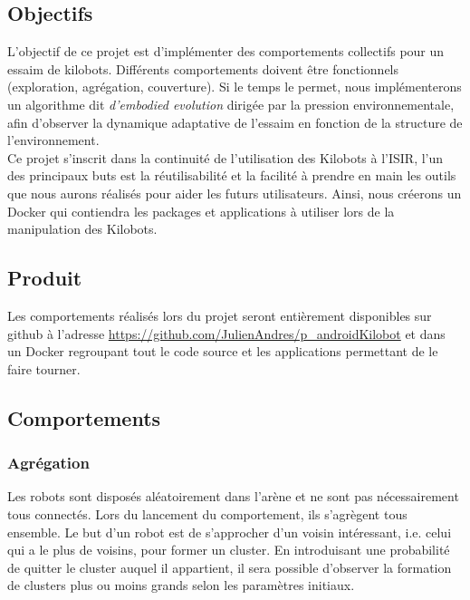 \documentclass[a4paper]{article}
\begin{document}
\subsection{Objectifs}

L'objectif de ce projet est d'implémenter des comportements collectifs pour un essaim de kilobots. Différents comportements doivent être fonctionnels (exploration, agrégation, couverture). Si le temps le permet, nous implémenterons un algorithme dit \textit{d'embodied evolution} dirigée par la pression environnementale, afin d'observer la dynamique adaptative de l'essaim en fonction de la structure de l'environnement. \\

Ce projet s'inscrit dans la continuité de l'utilisation des Kilobots à l'ISIR, l'un des principaux buts est la réutilisabilité et la facilité à prendre en main les outils que nous aurons réalisés pour aider les futurs utilisateurs. Ainsi, nous créerons un Docker qui contiendra les packages et applications à utiliser lors de la manipulation des Kilobots.

\subsection{Produit}

Les comportements réalisés lors du projet seront entièrement disponibles sur github à l'adresse
\url{https://github.com/JulienAndres/p_androidKilobot} et dans un Docker regroupant tout le code source et les applications permettant de le faire tourner.

\subsection{Comportements}

\subsubsection{Agrégation}

Les robots sont disposés aléatoirement dans l’arène et ne sont pas nécessairement tous
connectés. Lors du lancement du comportement, ils s’agrègent tous ensemble. Le but d'un robot est de s'approcher d'un voisin intéressant, i.e. celui qui a le plus de voisins, pour former un cluster.
En introduisant une probabilité de quitter le cluster auquel il appartient, il sera possible d'observer la formation de clusters plus ou moins grands selon les paramètres initiaux.
\end{document}
